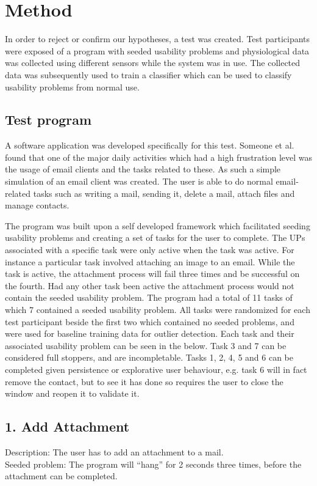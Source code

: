 
\section{Method}
In order to reject or confirm our hypotheses, a test was created.
Test participants were exposed of a program with seeded usability problems and physiological data was collected using different sensors while the system was in use. 
The collected data was subsequently used to train a classifier which can be used to classify usability problems from normal use.

\subsection{Test program}
A software application was developed specifically for this test. 
Someone et al. found that one of the major daily activities which had a high frustration level was the usage of email clients and the tasks related to these. 
As such a simple simulation of an email client was created. 
The user is able to do normal email-related tasks such as writing a mail, sending it, delete a mail, attach files and manage contacts. 

The program was built upon a self developed framework which facilitated seeding usability problems and creating a set of tasks for the user to complete. 
The UPs associated with a specific task were only active when the task was active. 
For instance a particular task involved attaching an image to an email. 
While the task is active, the attachment process will fail three times and be successful on the fourth. 
Had any other task been active the attachment process would not contain the seeded usability problem.
The program had a total of 11 tasks of which 7 contained a seeded usability problem. 
All tasks were randomized for each test participant beside the first two which contained no seeded problems, and were used for baseline training data for outlier detection. 
Each task and their associated usability problem can be seen in the below. 
Task 3 and 7 can be considered full stoppers, and are incompletable. 
Tasks 1, 2, 4, 5 and 6 can be completed given persistence or explorative user behaviour, e.g. task 6 will in fact remove the contact, but to see it has done so requires the user to close the window and reopen it to validate it.
\subsection*{1. Add Attachment}  
Description: The user has to add an attachment to a mail.\\
Seeded problem: The program will ``hang'' for 2 seconds three times, before the attachment can be completed.
